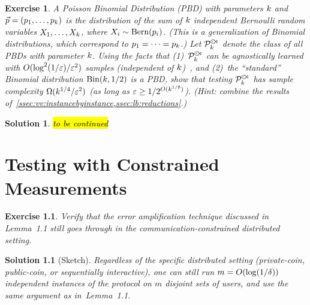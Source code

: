 \documentclass[biber]{nowfnt} %
\newtheorem{question}{Exercise}[chapter]
\newtheorem{solution}{Solution}[chapter]
\newcommand{\tbc}{\noindent\hl{\sc{}to be continued}\xspace}
\newcommand{\tbc}{}
\begin{document}
\begin{question}\label{ex:testing:pbd}
\newcommand{\pbd}{\hspace{1pt}{\cdot}\kern -4pt {\subset}\kern -3pt {\rtimes}}
  A \emph{Poisson Binomial Distribution} (PBD) with parameters $k$ and $\vec{p}=(p_1,\dots,p_k)$ is the distribution of the sum of $k$ independent Bernoulli random variables $X_1,\dots,X_k$, where $X_i \sim \operatorname{Bern}( p_i ) $. (This is a generalization of Binomial distributions, which correspond to $p_1=\dots=p_k$.) Let $\property^{\pbd}_{\ab}$ denote the class of all PBDs with parameter $k$. Using the facts that (1)~$\property^{\pbd}_{\ab}$ can be agnostically learned with $O(\log^2(1/\varepsilon)/\varepsilon^2)$ samples (independent of $k$)~\citep{DDS:PBD:15}, and (2)~the ``standard'' Binomial distribution $\binomial{\ab}{1/2}$ is a PBD, show that testing $\property^{\pbd}_{\ab}$ has sample complexity $\Omega(k^{1/4}/\varepsilon^2)$ (as long as $\varepsilon \geq 1/2^{O(k^{1/8})}$). \textit{(Hint: combine the results of~\cref{ssec:vv:instancebyinstance,ssec:lb:reductions}.)}
\end{question}
\begin{solution}
\tbc
\end{solution}

\chapter{Testing with Constrained Measurements}
  \label{chap:constrained}
  
  \begin{question}\label{exo:error:amplification}
Verify that the error amplification technique discussed in Lemma~1.1 still goes through in the communication-constrained distributed setting.
\end{question}
\begin{solution}[Sketch]
Regardless of the specific distributed setting (private-coin, public-coin, or sequentially interactive), one can still run $m=\bigO{\log(1/\errprob)}$ independent instances of the protocol on $m$ disjoint sets of users, and use the same argument as in~Lemma~1.1.
\end{solution}
\end{document}
